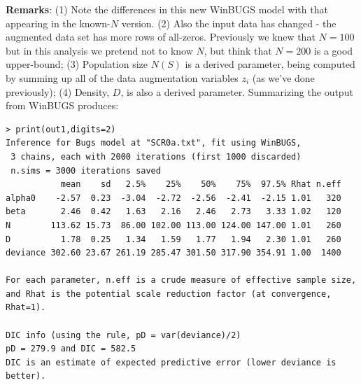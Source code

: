 {\bf Remarks}:  (1) Note the differences in this new WinBUGS model
with that appearing in the known-$N$ version.  (2) Also the input data
has changed - the augmented data set has more rows of
all-zeros. Previously we knew that $N=100$ but in this analysis we
pretend not to know $N$, but think that $N=200$ is a good upper-bound;
(3) Population size $N(S)$ is a derived parameter, being computed by
summing up all of the data augmentation variables $z_{i}$ (as we've
done previously); (4) Density, $D$, is also a derived
parameter. Summarizing the output from WinBUGS produces: 
{\small
\begin{verbatim}
> print(out1,digits=2)
Inference for Bugs model at "SCR0a.txt", fit using WinBUGS,
 3 chains, each with 2000 iterations (first 1000 discarded)
 n.sims = 3000 iterations saved
           mean    sd   2.5%    25%    50%    75%  97.5% Rhat n.eff
alpha0    -2.57  0.23  -3.04  -2.72  -2.56  -2.41  -2.15 1.01   320
beta       2.46  0.42   1.63   2.16   2.46   2.73   3.33 1.02   120
N        113.62 15.73  86.00 102.00 113.00 124.00 147.00 1.01   260
D          1.78  0.25   1.34   1.59   1.77   1.94   2.30 1.01   260
deviance 302.60 23.67 261.19 285.47 301.50 317.90 354.91 1.00  1400

For each parameter, n.eff is a crude measure of effective sample size,
and Rhat is the potential scale reduction factor (at convergence, Rhat=1).

DIC info (using the rule, pD = var(deviance)/2)
pD = 279.9 and DIC = 582.5
DIC is an estimate of expected predictive error (lower deviance is better).
\end{verbatim}
}

